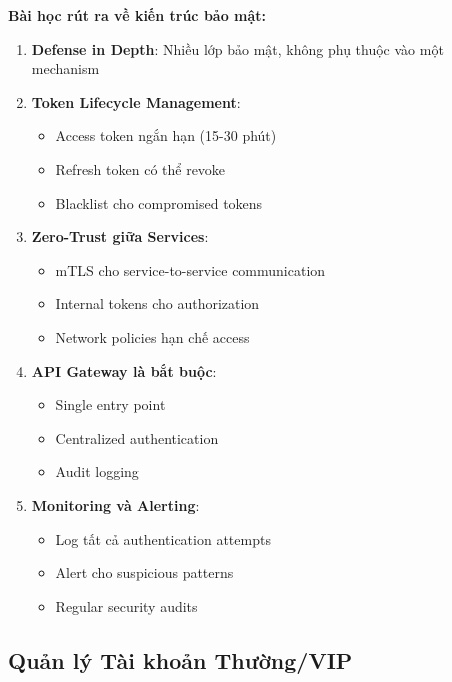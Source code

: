 \textbf{Bài học rút ra về kiến trúc bảo mật:}

\begin{enumerate}
    \item \textbf{Defense in Depth}: Nhiều lớp bảo mật, không phụ thuộc vào một mechanism
    
    \item \textbf{Token Lifecycle Management}:
    \begin{itemize}
        \item Access token ngắn hạn (15-30 phút)
        \item Refresh token có thể revoke
        \item Blacklist cho compromised tokens
    \end{itemize}
    
    \item \textbf{Zero-Trust giữa Services}:
    \begin{itemize}
        \item mTLS cho service-to-service communication
        \item Internal tokens cho authorization
        \item Network policies hạn chế access
    \end{itemize}
    
    \item \textbf{API Gateway là bắt buộc}:
    \begin{itemize}
        \item Single entry point
        \item Centralized authentication
        \item Audit logging
    \end{itemize}
    
    \item \textbf{Monitoring và Alerting}:
    \begin{itemize}
        \item Log tất cả authentication attempts
        \item Alert cho suspicious patterns
        \item Regular security audits
    \end{itemize}
\end{enumerate}

\subsection{Quản lý Tài khoản Thường/VIP}

